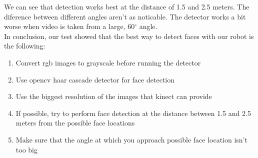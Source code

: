 \documentclass[12pt,a4paper]{article}
\begin{document}
	We can see that detection works best at the distance of 1.5 and 2.5 meters. The diference between different angles aren't as noticable. The detector works a bit worse when video is taken from a large, 60$^{\circ}$ angle. \\
	
	In conclusion, our test showed that the best way to detect faces with our robot is the following:
	\begin{enumerate}
		\item Convert rgb images to grayscale before running the detector
		\item Use opencv haar cascade detector for face detection
		\item Use the biggest resolution of the images that kinect can provide
		\item If possible, try to perform face detection at the distance between 1.5 and 2.5 meters from the possible face locations
		\item Make sure that the angle at which you approach possible face location isn't too big
	\end{enumerate}	
	
\end{document}
